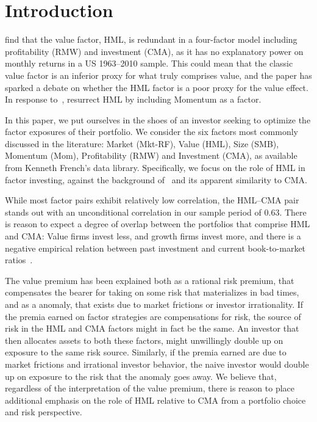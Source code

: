 \section{Introduction}
\textcite{FF2015} find that the value factor, HML, is redundant in a four-factor model including profitability (RMW) and investment (CMA), as it has no explanatory power on monthly returns in a US 1963–2010 sample. This could mean that the classic value factor is an inferior proxy for what truly comprises value, and the paper has sparked a debate on whether the HML factor is a poor proxy for the value effect. In response to~\textcite{FF2015}, \textcite{Asness2015} resurrect HML by including Momentum as a factor.

In this paper, we put ourselves in the shoes of an investor seeking to optimize the factor exposures of their portfolio. We consider the six factors most commonly discussed in the literature: Market (Mkt-RF), Value (HML), Size (SMB), Momentum (Mom), Profitability (RMW) and Investment (CMA), as available from Kenneth French's data library. Specifically, we focus on the role of HML in factor investing, against the background of~\textcite{FF2015,Asness2015} and its apparent similarity to CMA. 

While most factor pairs exhibit relatively low correlation, the HML--CMA pair stands out with an unconditional correlation in our sample period of 0.63. There is reason to expect a degree of overlap between the portfolios that comprise HML and CMA: Value firms invest less, and growth firms invest more, and there is a negative empirical relation between past investment and current book-to-market ratios~\autocite{Zhang2005,AndersonGarciaFeijoo2006}.

The value premium has been explained both as a rational risk premium, that compensates the bearer for taking on some risk that materializes in bad times, and as a anomaly, that exists due to market frictions or investor irrationality. If the premia earned on factor strategies are compensations for risk, the source of risk in the HML and CMA factors might in fact be the same. An investor that then allocates assets to both these factors, might unwillingly double up on exposure to the same risk source. Similarly, if the premia earned are due to market frictions and irrational investor behavior, the naive investor would double up on exposure to the risk that the anomaly goes away. We believe that, regardless of the interpretation of the value premium, there is reason to place additional emphasis on the role of HML relative to CMA from a portfolio choice and risk perspective.

